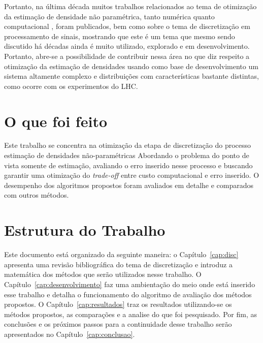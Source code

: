 Portanto, na última década muitos trabalhos relacionados ao tema de otimização da estimação de densidade não paramétrica, tanto numérica \cite{schindler2012bandwidth} quanto computacional \cite{gramacki2017nonparametric}, foram publicados, bem como sobre o tema de discretização em processamento de sinais, mostrando que este é um tema que mesmo sendo discutido há décadas ainda é muito utilizado, explorado e em desenvolvimento. Portanto, abre-se a possibilidade de contribuir nessa área no que diz respeito a otimização da estimação de densidades usando como base de desenvolvimento um sistema altamente complexo e distribuições com características bastante distintas, como ocorre com os experimentos do \ac{LHC}. 

\section{O que foi feito}

Este trabalho se concentra na otimização da etapa de discretização do processo estimação de densidades não-paramétricas Abordando o problema do ponto de vista somente de estimação, avaliando o erro inserido nesse processo e buscando garantir uma otimização do \textit{trade-off} entre custo computacional e erro inserido. O desempenho dos algoritmos propostos foram avaliados em detalhe e comparados com outros métodos.

\section{Estrutura do Trabalho}

Este documento está organizado da seguinte maneira: o Capítulo~\ref{cap:disc} apresenta uma revisão bibliográfica do tema de discretização e introduz a matemática dos métodos que serão utilizados nesse trabalho. O Capítulo~\ref{cap:desenvolvimento} faz uma ambientação do meio onde está inserido esse trabalho e detalha o funcionamento do algoritmo de avaliação dos métodos propostos. O Capítulo~\ref{cap:resultados} traz os resultados utilizando-se os métodos propostos, as comparações e a analise do que foi pesquisado. Por fim, as conclusões e os próximos passos para a continuidade desse trabalho serão apresentados no Capítulo~\ref{cap:conclusao}.


